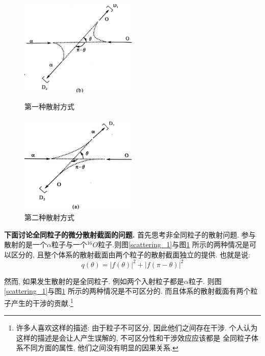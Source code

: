 \documentclass[a4paper, 11pt]{article}
\begin{document}
\begin{spacing}{1.2}
          \begin{figure}
            \begin{minipage}[t]{0.5\linewidth}
            \centering
            \includegraphics[width=2.2in]{image/scattering_1}
            \caption{第一种散射方式}
            \label{scattering_1}
            \end{minipage}%
            \begin{minipage}[t]{0.5\linewidth}
            \centering
            \includegraphics[width=2.2in]{image/scattering_2}
            \caption{第二种散射方式}
            \label{scattering_2}
            \end{minipage}
          \end{figure}

          \textbf{下面讨论全同粒子的微分散射截面的问题.} 
          首先思考非全同粒子的散射问题.  
          参与散射的是一个$\alpha$粒子与一个$^{16}O$粒子.则图\ref{scattering_1}与图\ref{scattering_2}
          所示的两种情况是可以区分的, 且整个体系的散射截面由两个粒子的散射截面独立的提供. 也就是说:
          \begin{equation}
            q(\theta) = |f(\theta)|^2 + |f(\pi-\theta)|^2
          \end{equation}
            
          然而, 如果发生散射的是全同粒子. 例如两个入射粒子都是$\alpha$粒子. 则图\ref{scattering_1}与图\ref{scattering_2}
          所示的两种情况是不可区分的. 而且体系的散射截面有两个粒子产生的干涉的贡献.\footnote{许多人喜欢这样的描述:
          由于粒子不可区分, 因此他们之间存在干涉. 个人认为这样的描述是会让人产生误解的, 不可区分性和干涉效应应该都是
          全同粒子体系不同方面的属性, 他们之间没有明显的因果关系.}


\end{spacing}
\end{document}
